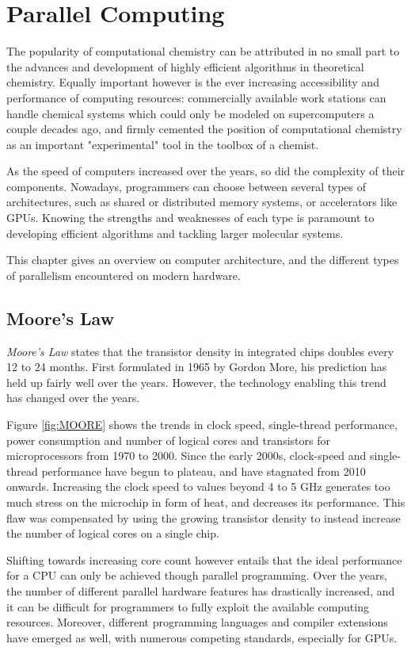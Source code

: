 \chapter{Parallel Computing}

The popularity of computational chemistry can be attributed in no small part to the advances and development of highly efficient algorithms in theoretical chemistry. Equally important however is the ever increasing accessibility and performance of computing resources: commercially available work stations can handle chemical systems which could only be modeled on supercomputers a couple decades ago, and firmly cemented the position of computational chemistry as an important "experimental" tool in the toolbox of a chemist. 

As the speed of computers increased over the years, so did the complexity of their components. Nowadays, programmers can choose between several types of architectures, such as shared or distributed memory systems, or accelerators like GPUs. Knowing the strengths and weaknesses of each type is paramount to developing efficient algorithms and tackling larger molecular systems.

This chapter gives an overview on computer architecture, and the different types of parallelism encountered on modern hardware.

\section{Moore's Law}

\emph{Moore's Law} states that the transistor density in integrated chips doubles every 12 to 24 months. First formulated in 1965 by Gordon More, his prediction has held up fairly well over the years. However, the technology enabling this trend has changed over the years.

Figure \ref{fig:MOORE} shows the trends in clock speed, single-thread performance, power consumption and number of logical cores and transistors for microprocessors from 1970 to 2000. Since the early 2000s, clock-speed and single-thread performance have begun to plateau, and have stagnated from 2010 onwards. Increasing the clock speed to values beyond 4 to 5 GHz generates too much stress on the microchip in form of heat, and decreases its performance. This flaw was compensated by using the growing transistor density to instead increase the number of logical cores on a single chip. 

Shifting towards increasing core count however entails that the ideal performance for a CPU can only be achieved though parallel programming. Over the years, the number of different parallel hardware features has drastically increased, and it can be difficult for programmers to fully exploit the available computing resources. Moreover, different programming languages and compiler extensions have emerged as well, with numerous competing standards, especially for GPUs. 

